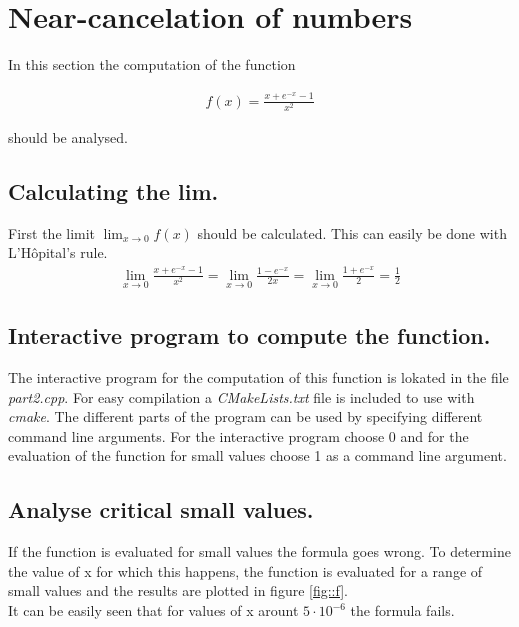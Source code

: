 \section{Near-cancelation of numbers}

In this section the computation of the function

\begin{align}
    f(x) = \frac{x+e^{-x}-1}{x^2}
\end{align}

should be analysed.

\subsection{Calculating the lim.}

First the limit $\lim_{x\to 0}f(x)$ should be calculated. This can easily be done with L'Hôpital's rule.
\begin{align}
\lim_{x\to 0}\frac{x+e^{-x}-1}{x^2} = \lim_{x\to 0} \frac{1-e^{-x}}{2x} = \lim_{x\to 0}\frac{1+e^{-x}}{2}=\frac{1}{2}   
\end{align}


\subsection{Interactive program to compute the function.}

The interactive program for the computation of this function is lokated
in the file \textit{part2.cpp}. For easy compilation
a \textit{CMakeLists.txt} file is included to use with \textit{cmake}.
The different parts of the program can be used by specifying different command line 
arguments. For the interactive program choose 0 and for the evaluation of the 
function for small values choose 1 as a command line argument.


\subsection{Analyse critical small values.}

If the function is evaluated for small values the formula goes wrong.
To determine the value of x for which this happens, the function
is evaluated for a range of small values and the results are plotted
in figure \ref{fig::f}.\\
It can be easily seen that for values of x arount $5\cdot 10^{-6}$ the formula
fails.

